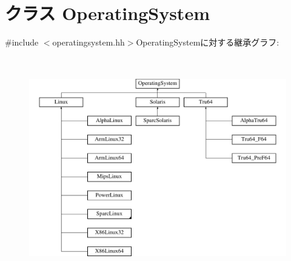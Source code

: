 \hypertarget{classOperatingSystem}{
\section{クラス OperatingSystem}
\label{classOperatingSystem}
}


{\ttfamily \#include $<$operatingsystem.hh$>$}OperatingSystemに対する継承グラフ:\begin{figure}[H]
\begin{center}
\leavevmode
\includegraphics[height=9.65517cm]{classOperatingSystem}
\end{center}
\end{figure}
